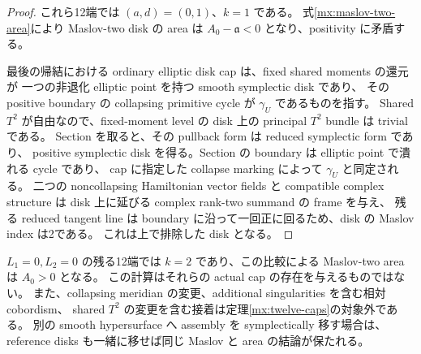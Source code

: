 \begin{proof}
これら12端では $(a,d)=(0,1)$、$k=1$ である。
式\eqref{mx:maslov-two-area}により Maslov-two disk の area は
$A_0-\mathfrak a<0$ となり、positivity に矛盾する。

最後の帰結における ordinary elliptic disk cap は、fixed shared moments の還元が
一つの非退化 elliptic point を持つ smooth symplectic disk であり、
その positive boundary の collapsing primitive cycle が $\gamma_U$ であるものを指す。
Shared $T^2$ が自由なので、fixed-moment level の disk 上の principal $T^2$ bundle は trivial である。
Section を取ると、その pullback form は reduced symplectic form であり、
positive symplectic disk を得る。Section の boundary は elliptic point で潰れる cycle であり、
cap に指定した collapse marking によって $\gamma_U$ と同定される。
二つの noncollapsing Hamiltonian vector fields と compatible complex structure は
disk 上に延びる complex rank-two summand の frame を与え、
残る reduced tangent line は boundary に沿って一回正に回るため、disk の Maslov index は2である。
これは上で排除した disk となる。
\end{proof}

$L_1=0,L_2=0$ の残る12端では $k=2$ であり、この比較による Maslov-two area は $A_0>0$ となる。
この計算はそれらの actual cap の存在を与えるものではない。
また、collapsing meridian の変更、additional singularities を含む相対 cobordism、
shared $T^2$ の変更を含む接着は定理\ref{mx:twelve-caps}の対象外である。
別の smooth hypersurface へ assembly を symplectically 移す場合は、
reference disks も一緒に移せば同じ Maslov と area の結論が保たれる。
